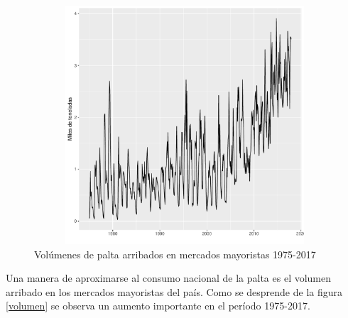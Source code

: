 \documentclass[12pt, twoside]{book}\usepackage[]{graphicx}\usepackage[]{color}
\newenvironment{knitrout}{}{} %
\numberwithin{equation}{section}
\numberwithin{theorem}{section}
\numberwithin{teorema}{section}
\numberwithin{defi}{section}
\numberwithin{prop}{section}
\numberwithin{defi}{section}
\theoremstyle{plain}
\begin{document}
\begin{knitrout}
\color{fgcolor}\begin{figure}[H]

{\centering \includegraphics[width=4.5in,height=3.5in]{figure/unnamed-chunk-4-1} 

}

\caption[Volúmenes de palta arribados en mercados mayoristas 1975-2017\label{volumen}]{Volúmenes de palta arribados en mercados mayoristas 1975-2017\label{volumen}}\label{fig:unnamed-chunk-4}
\end{figure}


\end{knitrout}

Una manera de aproximarse al consumo nacional de la palta es el volumen arribado en los mercados mayoristas del país. Como se desprende de la figura \ref{volumen} se observa un aumento importante en el período 1975-2017.  
\end{document}

